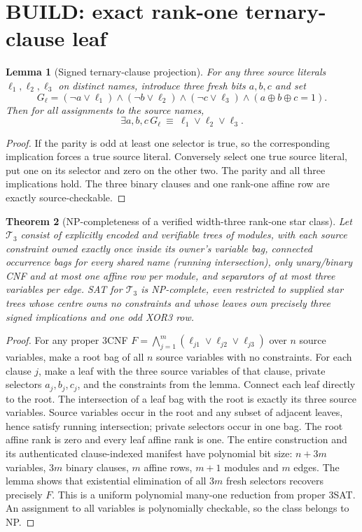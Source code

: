 \documentclass[11pt]{article}
\newtheorem{theorem}{Theorem}
\newtheorem{lemma}[theorem]{Lemma}
\begin{document}
\section{BUILD: exact rank-one ternary-clause leaf}
\begin{lemma}[Signed ternary-clause projection]
For any three source literals $\ell_1,\ell_2,\ell_3$ on distinct names, introduce three fresh bits $a,b,c$ and set
\[
G_\ell=(\neg a\vee\ell_1)\land(\neg b\vee\ell_2)
\land(\neg c\vee\ell_3)\land(a\oplus b\oplus c=1).
\]
Then for all assignments to the source names,
\[
\exists a,b,c\,G_\ell\ \equiv\ \ell_1\vee\ell_2\vee\ell_3.
\]
\end{lemma}
\begin{proof}
If the parity is odd at least one selector is true, so the corresponding implication forces a true source literal. Conversely select one true source literal, put one on its selector and zero on the other two. The parity and all three implications hold. The three binary clauses and one rank-one affine row are exactly source-checkable.
\end{proof}
\begin{theorem}[NP-completeness of a verified width-three rank-one star class]
Let $\mathcal T_3$ consist of explicitly encoded and verifiable trees of modules, with each source constraint owned exactly once inside its owner's variable bag, connected occurrence bags for every shared name (running intersection), only unary/binary CNF and at most one affine row per module, and separators of at most three variables per edge. SAT for $\mathcal T_3$ is NP-complete, even restricted to supplied star trees whose centre owns no constraints and whose leaves own precisely three signed implications and one odd XOR3 row.
\end{theorem}
\begin{proof}
For any proper 3CNF $F=\bigwedge_{j=1}^m(\ell_{j1}\vee\ell_{j2}\vee\ell_{j3})$ over $n$ source variables, make a root bag of all $n$ source variables with no constraints. For each clause $j$, make a leaf with the three source variables of that clause, private selectors $a_j,b_j,c_j$, and the constraints from the lemma. Connect each leaf directly to the root. The intersection of a leaf bag with the root is exactly its three source variables. Source variables occur in the root and any subset of adjacent leaves, hence satisfy running intersection; private selectors occur in one bag. The root affine rank is zero and every leaf affine rank is one. The entire construction and its authenticated clause-indexed manifest have polynomial bit size: $n+3m$ variables, $3m$ binary clauses, $m$ affine rows, $m+1$ modules and $m$ edges. The lemma shows that existential elimination of all $3m$ fresh selectors recovers precisely $F$. This is a uniform polynomial many-one reduction from proper 3SAT. An assignment to all variables is polynomially checkable, so the class belongs to NP.
\end{proof}
\end{document}

